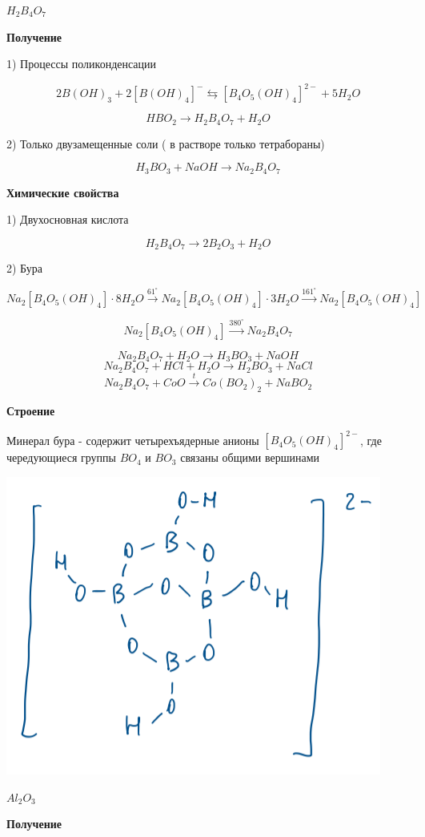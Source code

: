 $H_2B_4O_7$

\textbf{Получение}

1)  Процессы поликонденсации

$$2B(OH)_3 + 2[B(OH)_4]^- \leftrightarrows [B_4O_5(OH)_4]^{2-} + 5H_2O$$

$$HBO_2 \rightarrow H_2B_4O_7 + H_2O$$

2) Только двузамещенные соли ( в растворе только тетрабораны)

$$H_3BO_3 + NaOH \rightarrow Na_2B_4O_7$$

\textbf{Химические свойства}

1) Двухосновная кислота

$$H_2B_4O_7 \rightarrow 2B_2O_3 + H_2O$$

2) Бура

$$Na_2[B_4O_5(OH)_4]\cdot 8H_2O \xrightarrow{61^{\circ}} Na_2[B_4O_5(OH)_4]\cdot 3H_2O \xrightarrow{161^{\circ}} Na_2[B_4O_5(OH)_4]$$

$$Na_2[B_4O_5(OH)_4] \xrightarrow{380^{\circ}} Na_2B_4O_7$$

$$Na_2B_4O_7 + H_2O \rightarrow H_3BO_3 + NaOH$$
$$Na_2B_4O_7 + HCl + H_2O \rightarrow H_2BO_3 + NaCl$$
$$Na_2B_4O_7 + CoO \xrightarrow{t} Co(BO_2)_2 + NaBO_2$$

\textbf{Строение}

Минерал бура - содержит четырехъядерные анионы $[B_4O_5(OH)_4]^{2-}$, где чередующиеся группы $BO_4$ и $BO_3$ связаны общими вершинами

\includegraphics{images/11v7.png}

$Al_2O_3$

\textbf{Получение}

